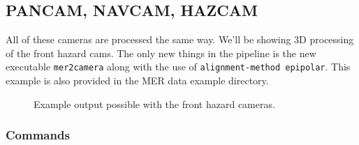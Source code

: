 \subsection{PANCAM, NAVCAM, HAZCAM}

All of these cameras are processed the same way. We'll be showing 3D
processing of the front hazard cams. The only new things in the
pipeline is the new executable \texttt{mer2camera} along with the use
of \texttt{alignment-method epipolar}. This example is also provided
in the MER data example directory.

\begin{figure}[h!]
\centering
  \hfil
\caption{Example output possible with the front hazard cameras.}
\label{fig:mer_example}
\end{figure}

\pagebreak

\subsubsection*{Commands}

